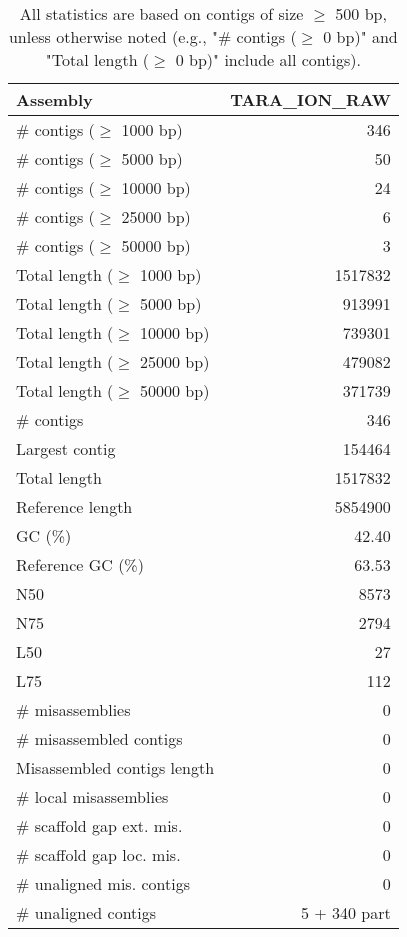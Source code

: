 \documentclass[12pt,a4paper]{article}
\begin{document}
\begin{table}[ht]
\begin{center}
\caption{All statistics are based on contigs of size $\geq$ 500 bp, unless otherwise noted (e.g., "\# contigs ($\geq$ 0 bp)" and "Total length ($\geq$ 0 bp)" include all contigs).}
\begin{tabular}{|l*{1}{|r}|}
\hline
Assembly & TARA\_ION\_RAW \\ \hline
\# contigs ($\geq$ 1000 bp) & 346 \\ \hline
\# contigs ($\geq$ 5000 bp) & 50 \\ \hline
\# contigs ($\geq$ 10000 bp) & 24 \\ \hline
\# contigs ($\geq$ 25000 bp) & 6 \\ \hline
\# contigs ($\geq$ 50000 bp) & 3 \\ \hline
Total length ($\geq$ 1000 bp) & 1517832 \\ \hline
Total length ($\geq$ 5000 bp) & 913991 \\ \hline
Total length ($\geq$ 10000 bp) & 739301 \\ \hline
Total length ($\geq$ 25000 bp) & 479082 \\ \hline
Total length ($\geq$ 50000 bp) & 371739 \\ \hline
\# contigs & 346 \\ \hline
Largest contig & 154464 \\ \hline
Total length & 1517832 \\ \hline
Reference length & 5854900 \\ \hline
GC (\%) & 42.40 \\ \hline
Reference GC (\%) & 63.53 \\ \hline
N50 & 8573 \\ \hline
N75 & 2794 \\ \hline
L50 & 27 \\ \hline
L75 & 112 \\ \hline
\# misassemblies & 0 \\ \hline
\# misassembled contigs & 0 \\ \hline
Misassembled contigs length & 0 \\ \hline
\# local misassemblies & 0 \\ \hline
\# scaffold gap ext. mis. & 0 \\ \hline
\# scaffold gap loc. mis. & 0 \\ \hline
\# unaligned mis. contigs & 0 \\ \hline
\# unaligned contigs & 5 + 340 part \\ \hline

\end{tabular}
\end{center}
\end{table}
\end{document}
